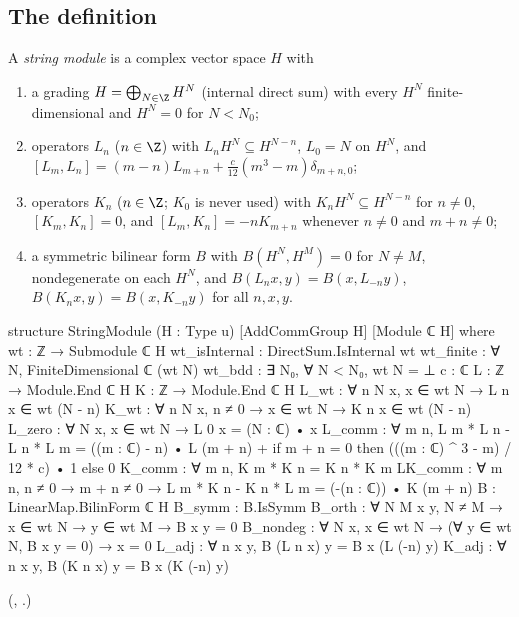 \subsection{The definition}

\begin{definition}\label{ch18:def:stringmodule}
A \emph{string module} is a complex vector space $H$ with
\begin{enumerate}[label=(S\arabic*)]
\item a grading $H=\bigoplus_{N\in\Z}H^N$ (internal direct sum) with every $H^N$ finite-dimensional and
  $H^N=0$ for $N<N_0$;
\item operators $L_n$ ($n\in\Z$) with $L_nH^N\subseteq H^{N-n}$, $L_0=N$ on $H^N$, and
  $[L_m,L_n]=(m-n)L_{m+n}+\frac{c}{12}(m^3-m)\delta_{m+n,0}$;
\item operators $K_n$ ($n\in\Z$; $K_0$ is never used) with $K_nH^N\subseteq H^{N-n}$ for $n\neq0$,
  $[K_m,K_n]=0$, and $[L_m,K_n]=-nK_{m+n}$ whenever $n\neq0$ and $m+n\neq0$;
\item a symmetric bilinear form $B$ with $B(H^N,H^M)=0$ for $N\ne M$, nondegenerate on each $H^N$, and
  $B(L_nx,y)=B(x,L_{-n}y)$, $B(K_nx,y)=B(x,K_{-n}y)$ for all $n,x,y$.
\end{enumerate}
\end{definition}

\begin{leancode}
structure StringModule (H : Type u) [AddCommGroup H] [Module ℂ H] where
  wt : ℤ → Submodule ℂ H
  wt_isInternal : DirectSum.IsInternal wt
  wt_finite : ∀ N, FiniteDimensional ℂ (wt N)
  wt_bdd : ∃ N₀, ∀ N < N₀, wt N = ⊥
  c : ℂ
  L : ℤ → Module.End ℂ H
  K : ℤ → Module.End ℂ H
  L_wt : ∀ n N x, x ∈ wt N → L n x ∈ wt (N - n)
  K_wt : ∀ n N x, n ≠ 0 → x ∈ wt N → K n x ∈ wt (N - n)
  L_zero : ∀ N x, x ∈ wt N → L 0 x = (N : ℂ) • x
  L_comm : ∀ m n, L m * L n - L n * L m =
    ((m : ℂ) - n) • L (m + n) +
      if m + n = 0 then (((m : ℂ) ^ 3 - m) / 12 * c) • 1 else 0
  K_comm : ∀ m n, K m * K n = K n * K m
  LK_comm : ∀ m n, n ≠ 0 → m + n ≠ 0 →
    L m * K n - K n * L m = (-(n : ℂ)) • K (m + n)
  B : LinearMap.BilinForm ℂ H
  B_symm : B.IsSymm
  B_orth : ∀ N M x y, N ≠ M → x ∈ wt N → y ∈ wt M → B x y = 0
  B_nondeg : ∀ N x, x ∈ wt N → (∀ y ∈ wt N, B x y = 0) → x = 0
  L_adj : ∀ n x y, B (L n x) y = B x (L (-n) y)
  K_adj : ∀ n x y, B (K n x) y = B x (K (-n) y)
\end{leancode}
(, .)

